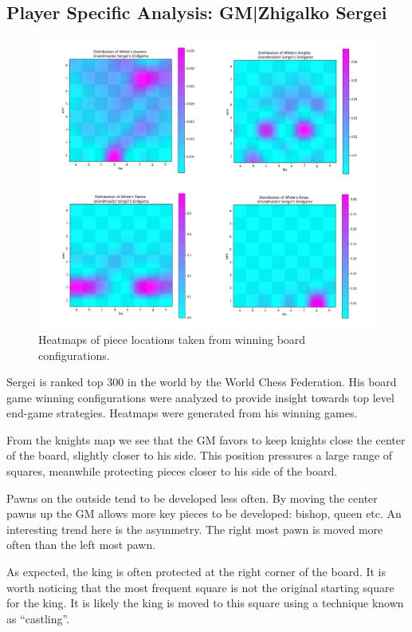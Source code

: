 \documentclass[reprint,
 amsmath,amssymb,nobibnotes,
 aps, floatfix]{revtex4-1}
\begin{document}
\subsection{Player Specific Analysis: GM|Zhigalko Sergei}
\begin{figure}[hb]
    \centering
    \includegraphics[scale=1.3]{heatmaps.png}
    \caption{Heatmaps of piece locations taken from winning board configurations.}
    \label{fig:my_label}
\end{figure}

Sergei is ranked top 300 in the world by the World Chess Federation. His board game winning configurations were analyzed to provide insight towards top level end-game strategies. Heatmaps were generated from his winning games.

From the knights map we see that the GM favors to keep knights close the center of the board, slightly closer to his side. This position pressures a large range of squares, meanwhile protecting pieces closer to his side of the board.

Pawns on the outside tend to be developed less often. By moving the center pawns up the GM allows more key pieces to be developed: bishop, queen etc. An interesting trend here is the asymmetry. The right most pawn is moved more often than the left most pawn.

As expected, the king is often protected at the right corner of the board. It is worth noticing that the most frequent square is not the original starting square for the king. It is likely the king is moved to this square using a technique known as “castling”.
\end{document}
